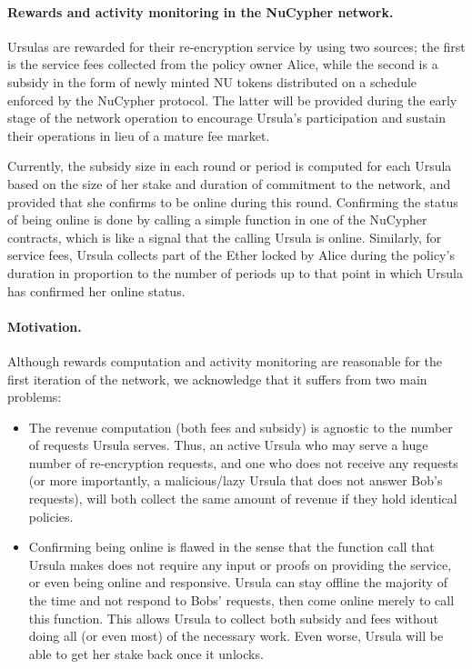 \paragraph{\bf Rewards and activity monitoring in the NuCypher network.}
Ursulas are rewarded for their re-encryption service by using two sources; the first is the service fees collected from the policy owner Alice, while the second is a subsidy in the form of newly minted NU tokens distributed on a schedule enforced by the NuCypher protocol. The latter will be provided during the early stage of the network operation to encourage Ursula's participation and sustain their operations in lieu of a mature fee market.


Currently, the subsidy size in each round or period is computed for each Ursula based on the size of her stake and duration of commitment to the network, and provided that she confirms to be online during this round. Confirming the status of being online is done by calling a simple function in one of the NuCypher contracts, which is like a signal that the calling Ursula is online. Similarly, for service fees, Ursula collects part of the Ether locked by Alice during the policy's duration in proportion to the number of periods up to that point in which Ursula has confirmed her online status.


\paragraph{\bf Motivation.} Although rewards computation and activity monitoring are reasonable for the first iteration of the network, we acknowledge that it suffers from two main problems:
\begin{itemize}
\setlength{\itemsep}{0pt}
\item The revenue computation (both fees and subsidy) is agnostic to the number of requests Ursula serves. Thus, an active Ursula who may serve a huge number of re-encryption requests, and one who does not receive any requests (or more importantly, a malicious/lazy Ursula that does not answer Bob's requests), will both collect the same amount of revenue if they hold identical policies.

\item Confirming being online is flawed in the sense that the function call that Ursula makes does not require any input or proofs on providing the service, or even being online and responsive. Ursula can stay offline the majority of the time and not respond to Bobs' requests, then come online merely to call this function. This allows Ursula to collect both subsidy and fees without doing all (or even most) of the necessary work. Even worse, Ursula will be able to get her stake back once it unlocks.
\end{itemize}

